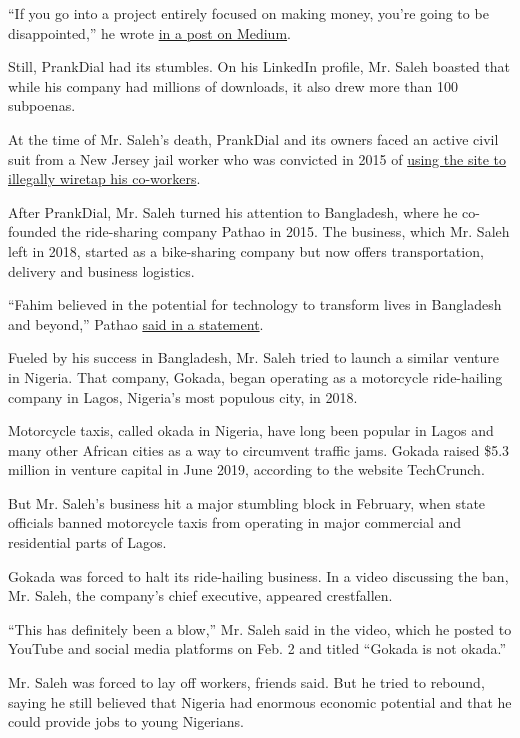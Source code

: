 ``If you go into a project entirely focused on making money, you're
going to be disappointed,'' he wrote
\href{https://medium.com/datadriveninvestor/what-i-learned-from-turning-a-prank-calling-passion-project-into-a-multi-million-dollar-product-1486b4cda535}{in
a post on Medium}.

Still, PrankDial had its stumbles. On his LinkedIn profile, Mr. Saleh
boasted that while his company had millions of downloads, it also drew
more than 100 subpoenas.

At the time of Mr. Saleh's death, PrankDial and its owners faced an
active civil suit from a New Jersey jail worker who was convicted in
2015 of
\href{https://www.nj.com/hudson/2015/09/ex-deputy_director_of_hudson_county_jail_sentenced.html}{using
the site to illegally wiretap his co-workers}.

After PrankDial, Mr. Saleh turned his attention to Bangladesh, where he
co-founded the ride-sharing company Pathao in 2015. The business, which
Mr. Saleh left in 2018, started as a bike-sharing company but now offers
transportation, delivery and business logistics.

``Fahim believed in the potential for technology to transform lives in
Bangladesh and beyond,'' Pathao
\href{https://www.instagram.com/p/CCqBMNcDFIT/}{said in a statement}.

Fueled by his success in Bangladesh, Mr. Saleh tried to launch a similar
venture in Nigeria. That company, Gokada, began operating as a
motorcycle ride-hailing company in Lagos, Nigeria's most populous city,
in 2018.

Motorcycle taxis, called okada in Nigeria, have long been popular in
Lagos and many other African cities as a way to circumvent traffic jams.
Gokada raised \$5.3 million in venture capital in June 2019, according
to the website TechCrunch.

But Mr. Saleh's business hit a major stumbling block in February, when
state officials banned motorcycle taxis from operating in major
commercial and residential parts of Lagos.

Gokada was forced to halt its ride-hailing business. In a video
discussing the ban, Mr. Saleh, the company's chief executive, appeared
crestfallen.

``This has definitely been a blow,'' Mr. Saleh said in the video, which
he posted to YouTube and social media platforms on Feb. 2 and titled
``Gokada is not okada.''

Mr. Saleh was forced to lay off workers, friends said. But he tried to
rebound, saying he still believed that Nigeria had enormous economic
potential and that he could provide jobs to young Nigerians.

